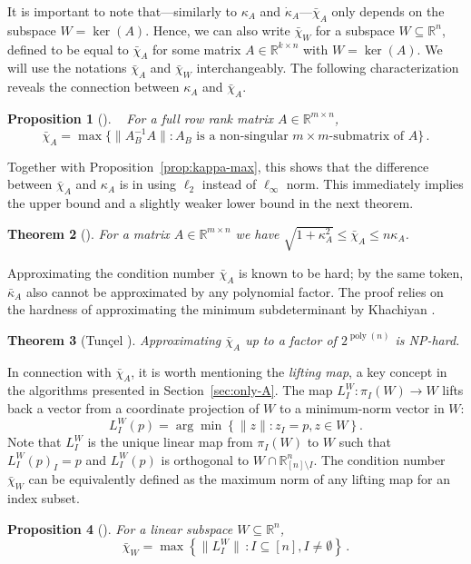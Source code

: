 \documentclass[11pt, a4paper]{article}
\newcommand{\1}{\mathbbm{1}}
\newtheorem{theorem}{Theorem}[section]
\newtheorem{prop}[theorem]{Proposition}
\theoremstyle{case}
\newcommand{\R}{\mathbb{R}}
\begin{document}
It is important to note that---similarly to $\kappa_A$ and $\dot\kappa_A$---$\bar\chi_A$ only depends on the subspace
$W=\ker(A)$. Hence, we can also write $\bar\chi_W$ for a subspace
$W\subseteq \R^n$, defined to be equal to $\bar\chi_A$ for some matrix
$A\in \R^{k\times n}$ with $W=\ker(A)$. We will use the notations $\bar\chi_A$ and
$\bar\chi_W$ interchangeably. The following characterization reveals the connection between $\kappa_A$ and $\bar\chi_A$.

\begin{prop}[\cite{Todd2001}]\label{prop:chibar}~
For a full row rank matrix $A\in \R^{m\times n}$, 
\[\bar\chi_A = \max\{ \|A_B^{-1} A\| : A_B \text{ is a non-singular $m \times m$-submatrix of } A\} \, .\]
\end{prop}
Together with Proposition~\ref{prop:kappa-max}, this shows that the difference between  $\bar\chi_A$ and $\kappa_A$ is in using $\ell_2$ instead of $\ell_\infty$ norm.
This immediately implies the upper bound and a slightly weaker lower bound in the next theorem.

\begin{theorem}[\cite{DHNV20,DadushNV20}]\label{theorem:kappa_chi_bar_approx}
For a matrix $A \in \R^{m \times n}$ we have $\sqrt{1 + \kappa_A^2} \le \bar\chi_A \le n\kappa_A$.
\end{theorem}

Approximating the condition number $\bar\chi_A$ is known to be hard; by the same token, $\bar\kappa_A$ also cannot be approximated by any polynomial factor. The proof relies on the hardness of approximating the minimum subdeterminant by Khachiyan \cite{khachiyan1995}.
\begin{theorem}[{Tun{\c{c}}el \cite{Tuncel1999}}]\label{thm:chi-inapprox}
  Approximating $\bar\chi_A$ up to a factor of $2^{\operatorname{poly}(n)}$ is NP-hard.
\end{theorem}

\medskip

In connection with $\bar\chi_A$, it is worth mentioning the  {\em lifting map}, a key concept in the algorithms presented in Section~\ref{sec:only-A}. The map 
$L_I^W : \pi_{I}(W) \to W$ lifts back a vector from a coordinate projection of $W$ to a minimum-norm vector in $W$:
\[
L_I^W(p) = \arg\min\left\{\|z\| : z_I = p, z \in W\right\}.
\]
Note that $L_I^W$ is the unique linear map from $\pi_{I}(W)$ to $W$ such that
$L_I^W(p)_I = p$ and $L_I^W(p)$ is orthogonal to $W \cap \R^n_{[n] \setminus
I}$. 
The condition number $\bar\chi_W$ can be equivalently defined as the maximum norm of any lifting map for an index subset.  
\begin{prop}[\cite{DHNV20,OLeary1990,stewart}]\label{prop:subspace-chi}
  For a linear subspace $W  \subseteq \R^n$,
  \[
  \bar{\chi}_W =\max\left\{ \|L_I^W\|\, : {I\subseteq [n]}, I\neq\emptyset\right\}\, .
  \]
\end{prop}
\end{document}
